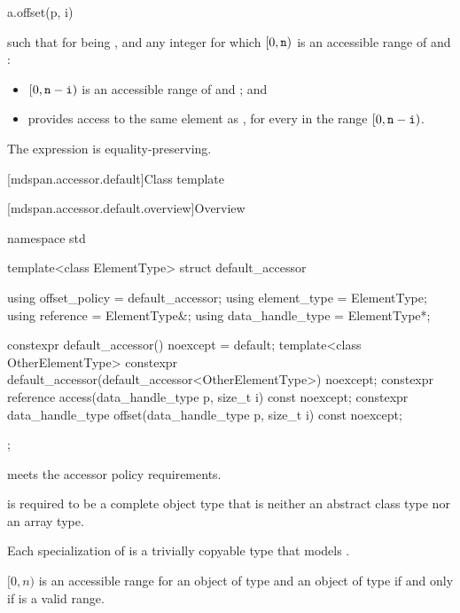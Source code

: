 \begin{itemdecl}
a.offset(p, i)
\end{itemdecl}

\begin{itemdescr}
\pnum
\result
{}

\pnum
\returns
{} such that for  being , and
any integer  for which $[0, \texttt{\protect n})$ is
an accessible range of  and :
\begin{itemize}
\item
$[0, \texttt{\protect n} - \texttt{\protect i})$ is an accessible range of  and ; and
\item
{} provides access to
the same element as ,
for every  in the range $[0, \texttt{\protect n} - \texttt{\protect i})$.
\end{itemize}

\pnum
\remarks
The expression is equality-preserving.
\end{itemdescr}

[mdspan.accessor.default]{Class template }

[mdspan.accessor.default.overview]{Overview}

\begin{codeblock}
namespace std {
  template<class ElementType>
  struct default_accessor {
    using offset_policy = default_accessor;
    using element_type = ElementType;
    using reference = ElementType&;
    using data_handle_type = ElementType*;

    constexpr default_accessor() noexcept = default;
    template<class OtherElementType>
      constexpr default_accessor(default_accessor<OtherElementType>) noexcept;
    constexpr reference access(data_handle_type p, size_t i) const noexcept;
    constexpr data_handle_type offset(data_handle_type p, size_t i) const noexcept;
  };
}
\end{codeblock}

\pnum
{} meets the accessor policy requirements.

\pnum
{} is required to be a complete object type
that is neither an abstract class type nor an array type.

\pnum
Each specialization of  is
a trivially copyable type that models .

\pnum
$[0, n)$ is an accessible range for
an object  of type  and
an object of type 
if and only if  is a valid range.

